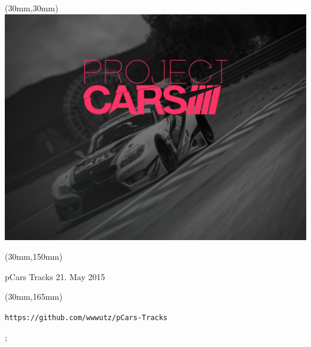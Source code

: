 \documentclass[oneside, a4paper, 12pt]{book}
\begin{document}
\selectfont
\textblockorigin{0cm}{0cm}

\newlength{\Logo}
\setlength{\Logo}{210mm-60mm}
\begin{textblock*}{\Logo}(30mm,30mm)%
\includegraphics[width=\Logo]{pcars-main.png}
\end{textblock*}

\begin{textblock*}{\Logo}(30mm,150mm)%
\begin{center}\Huge{pCars Tracks 21. May 2015}\end{center}
\end{textblock*}

\begin{textblock*}{\Logo}(30mm,165mm)%
\begin{center}\tt\large{https://github.com/wwwutz/pCars-Tracks}\end{center}
\end{textblock*}


;

\end{document}
